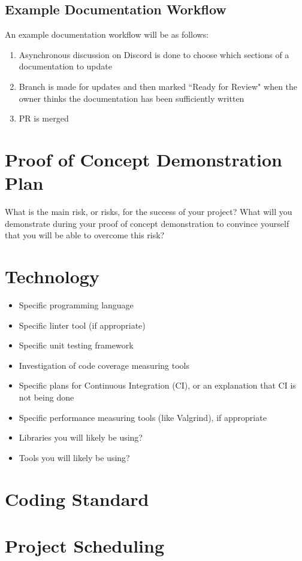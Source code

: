 \documentclass{article}
\begin{document}
\subsection{Example Documentation Workflow}
An example documentation workflow will be as follows:
\begin{enumerate}
	\item Asynchronous discussion on Discord is done to choose which sections of a documentation to update
	\item Branch is made for updates and then marked ``Ready for Review" when the owner thinks the documentation has been sufficiently written
	\item PR is merged
\end{enumerate}

\section{Proof of Concept Demonstration Plan}

What is the main risk, or risks, for the success of your project?  What will you
demonstrate during your proof of concept demonstration to convince yourself that
you will be able to overcome this risk?

\section{Technology}

\begin{itemize}
\item Specific programming language
\item Specific linter tool (if appropriate)
\item Specific unit testing framework
\item Investigation of code coverage measuring tools
\item Specific plans for Continuous Integration (CI), or an explanation that CI
  is not being done
\item Specific performance measuring tools (like Valgrind), if
  appropriate
\item Libraries you will likely be using?
\item Tools you will likely be using?
\end{itemize}

\section{Coding Standard}

\section{Project Scheduling}

\end{document}
